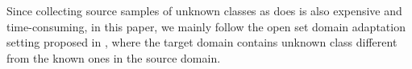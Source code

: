 Since collecting source samples of unknown classes as \cite{OpensetsDA} does is also expensive and time-consuming, in this paper, we mainly follow the open set domain adaptation setting proposed in \cite{OpensetDA-bp}, where the target domain contains unknown class different from the known ones in the source domain. 

